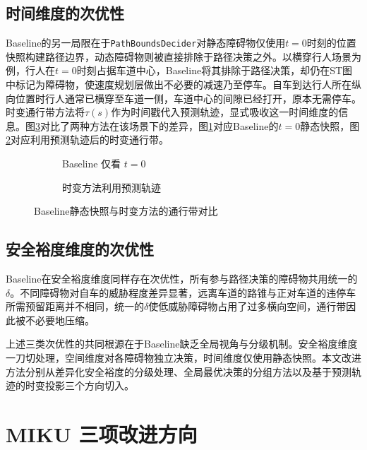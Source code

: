 \subsection{时间维度的次优性}
Baseline的另一局限在于\texttt{PathBoundsDecider}对静态障碍物仅使用$t{=}0$时刻的位置快照构建路径边界，动态障碍物则被直接排除于路径决策之外。以横穿行人场景为例，行人在$t = 0$时刻占据车道中心，Baseline将其排除于路径决策，却仍在ST图中标记为障碍物，使速度规划层做出不必要的减速乃至停车。自车到达行人所在纵向位置时行人通常已横穿至车道一侧，车道中心的间隙已经打开，原本无需停车。时变通行带方法将$\tau(s)$作为时间戳代入预测轨迹，显式吸收这一时间维度的信息。图\ref{fig:time_varying_gap}对比了两种方法在该场景下的差异，图\ref{fig:time_varying_gap:a}对应Baseline的$t{=}0$静态快照，图\ref{fig:time_varying_gap:b}对应利用预测轨迹后的时变通行带。

\begin{figure}[htbp]
\centering
\begin{subfigure}[b]{0.48\textwidth}
  \centering
  \caption{Baseline 仅看 $t{=}0$}
  \label{fig:time_varying_gap:a}
\end{subfigure}\hfill
\begin{subfigure}[b]{0.48\textwidth}
  \centering
  \caption{时变方法利用预测轨迹}
  \label{fig:time_varying_gap:b}
\end{subfigure}
\caption{Baseline静态快照与时变方法的通行带对比}
\label{fig:time_varying_gap}
\end{figure}

\subsection{安全裕度维度的次优性}

Baseline在安全裕度维度同样存在次优性，所有参与路径决策的障碍物共用统一的$\delta$。不同障碍物对自车的威胁程度差异显著，远离车道的路锥与正对车道的违停车所需预留距离并不相同，统一的$\delta$使低威胁障碍物占用了过多横向空间，通行带因此被不必要地压缩。

上述三类次优性的共同根源在于Baseline缺乏全局视角与分级机制。安全裕度维度一刀切处理，空间维度对各障碍物独立决策，时间维度仅使用静态快照。本文改进方法分别从差异化安全裕度的分级处理、全局最优决策的分组方法以及基于预测轨迹的时变投影三个方向切入。

\section{MIKU 三项改进方向}
\label{sec:miku_roadmap}

